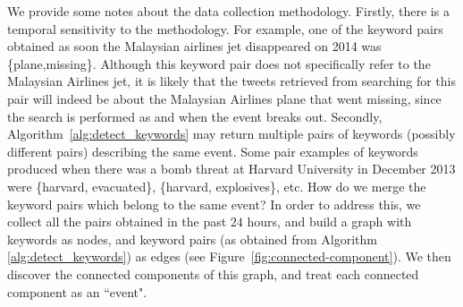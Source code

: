 We provide some notes about the data collection methodology. 
%
Firstly, there is a temporal sensitivity to the methodology. 
%
For example, one of the keyword pairs obtained as soon the Malaysian airlines
jet disappeared on 2014 was \{plane,missing\}. 
%
Although this keyword pair does not specifically refer to the Malaysian Airlines
jet, it is likely that the tweets retrieved from searching for this pair will
indeed be about the Malaysian Airlines plane that went missing, since the search
is performed as and when the event breaks out. 
%
Secondly, Algorithm~\ref{alg:detect_keywords} may return multiple pairs of
keywords (possibly different pairs) describing the same event. 
%
Some pair examples of keywords produced when there was a bomb threat at Harvard
University in December 2013 were \{harvard, evacuated\}, \{harvard,
explosives\}, etc. 
%
How do we merge the keyword pairs which belong to the same event? 
%
In order to address this, we collect all the pairs obtained in the past $24$
hours, and build a graph with keywords as nodes, and keyword pairs (as obtained
from Algorithm {\ref{alg:detect_keywords}}) as edges (see
Figure~\ref{fig:connected-component}). 
%
We then discover the connected components of this graph, and treat each
connected component as an ``event". 
%



